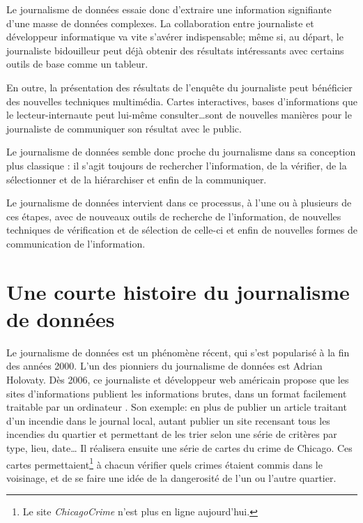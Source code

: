 Le journalisme de données essaie donc d'extraire une information signifiante 
d'une masse de données complexes. La collaboration entre journaliste et développeur 
informatique va vite s'avérer indispensable; même si, au départ, le journaliste \og 
bidouilleur \fg peut déjà obtenir des résultats intéressants avec certains outils de 
base comme un tableur.

En outre, la présentation des résultats de l'enquête du journaliste peut bénéficier 
des nouvelles techniques multimédia. Cartes interactives, bases d'informations
que le lecteur-internaute peut lui-même consulter\dots sont de nouvelles
manières pour le journaliste de communiquer son résultat avec le public. \cite{handbook,bradshaw}

Le journalisme de données semble donc proche du journalisme dans sa conception 
plus classique : il s'agit toujours de rechercher l'information, de la vérifier, 
de la sélectionner et de la hiérarchiser et enfin de la communiquer. 

Le journalisme de données intervient dans ce processus, à l'une ou à plusieurs de ces 
étapes, avec de nouveaux outils de recherche de l'information, de nouvelles 
techniques de vérification et de sélection de celle-ci et enfin de nouvelles 
formes de communication de l'information. \cite{handbook}


\section{Une courte histoire du journalisme de données}

Le journalisme de données est un phénomène récent, qui s'est popularisé à la
fin des années 2000. L'un des pionniers du journalisme de données est Adrian Holovaty. Dès 2006, 
ce journaliste et développeur web américain propose \cite{holovaty} que les sites d'informations publient les informations 
brutes, dans un format facilement traitable par un ordinateur \cite{handbookfr}.
Son exemple: en plus de publier un article traitant d'un incendie dans le 
journal local, autant publier un site recensant tous les incendies du quartier 
et permettant de les trier selon une série de critères par type, lieu, date\dots
Il réalisera ensuite une série de \og cartes du crime \fg de 
Chicago. Ces cartes permettaient\footnote{Le site \textit{ChicagoCrime} n'est plus en ligne aujourd'hui.} à chacun vérifier quels crimes étaient commis dans le voisinage, et de se faire une idée de la dangerosité de l'un ou l'autre quartier.


